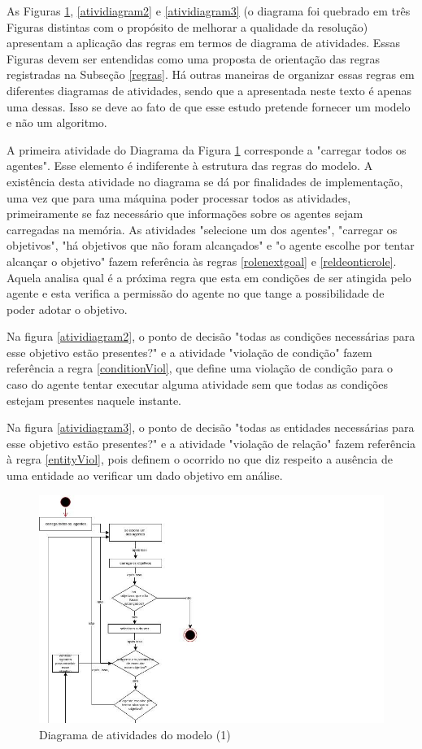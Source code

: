 As Figuras \ref{atividiagram1}, \ref{atividiagram2} e \ref{atividiagram3} (o diagrama foi quebrado em três Figuras distintas com o propósito de melhorar a qualidade da resolução)  apresentam a aplicação das regras em termos de diagrama de atividades. Essas Figuras devem ser entendidas como uma proposta de orientação das regras registradas na Subseção \ref{regras}. Há outras maneiras de organizar essas regras em diferentes diagramas de atividades, sendo que a apresentada neste texto é apenas uma dessas. Isso se deve ao fato de que esse estudo pretende fornecer um modelo e não um algoritmo. 

A primeira atividade do Diagrama da Figura \ref{atividiagram1} corresponde a "carregar todos os agentes". Esse elemento é indiferente à estrutura das regras do modelo. A existência desta atividade no diagrama se dá por finalidades de implementação, uma vez que para uma máquina poder processar todos as atividades, primeiramente se faz necessário que informações sobre os agentes sejam carregadas na memória. As atividades "selecione um dos agentes", "carregar os objetivos", "há objetivos que não foram alcançados" e "o agente escolhe por tentar alcançar o objetivo" fazem referência às regras \ref{rolenextgoal} e \ref{reldeonticrole}. Aquela analisa qual é a próxima regra que esta em condições de ser atingida pelo agente e esta verifica a permissão do agente no que tange a possibilidade de poder adotar o objetivo. 

Na figura \ref{atividiagram2}, o ponto de decisão "todas as condições necessárias para esse objetivo estão presentes?" e a atividade "violação de condição" fazem referência a regra \ref{conditionViol}, que define uma violação de condição para o caso do agente tentar executar alguma atividade sem que todas as condições estejam presentes naquele instante.

Na figura \ref{atividiagram3}, o ponto de decisão "todas as entidades necessárias para esse objetivo estão presentes?" e a atividade "violação de relação" fazem referência à regra \ref{entityViol}, pois definem o ocorrido no que diz respeito a ausência de uma entidade ao verificar um dado objetivo em análise. 

\begin{figure}[H]
  \centering
  \includegraphics[width=1.1\linewidth]{figure/diag1.jpg} 
  \caption{Diagrama de atividades do modelo (1)}
  \label{atividiagram1}
\end{figure}



